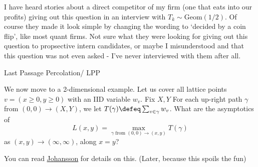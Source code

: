 \begin{remark}
    I have heard stories about a direct competitor of my firm (one that eats into our profits) giving out this question in an interview with $T_k \sim \text{Geom}(1/2)$. Of course they made it look simple by changing the wording to `decided by a coin flip', like most quant firms. Not sure what they were looking for giving out this question to propsective intern candidates, or maybe I misunderstood and that this question was not even asked - I've never interviewed with them after all.
\end{remark}

\begin{aexample}[breakable=false]{Last Passage Percolation/ LPP}{}
    
\begin{center}
    

\end{center}
\end{aexample}

We now move to a 2-dimensional example. Let us cover all lattice points $v=(x\geq 0,y\geq 0)$ with an IID variable $w_v$. Fix $X,Y$ For each up-right path $\gamma$ from $(0,0) \to (X,Y)$, we let $T(\gamma)\defeq \sum_{v\in \gamma} w_v$.
What are the asymptotics of \[
L(x,y) = \max_{\gamma \text{ from } (0,0)\to (x,y)} T(\gamma)
\]
as $(x,y)\to (\infty,\infty)$, along $x=y$?
\begin{remark}
    You can read \href{https://arxiv.org/pdf/math/9903134}{Johansson} for details on this. (Later, because this spoils the fun)
\end{remark}